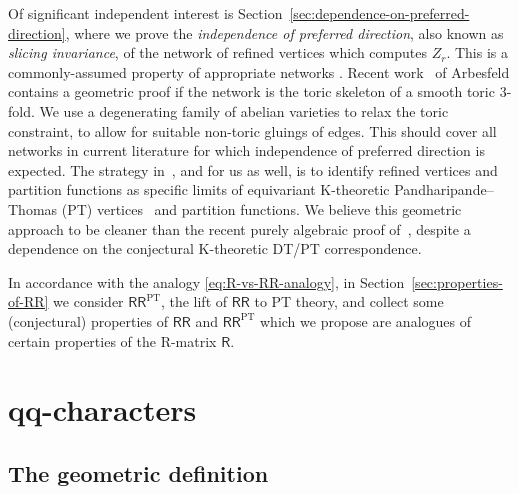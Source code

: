 \documentclass[10pt,a4paper]{amsart}
\numberwithin{equation}{section}
\newcommand{\sR}{\mathsf{R}}
\newcommand{\sRR}{\mathsf{RR}}
\DeclareMathOperator{\PT}{PT}
\begin{document}
Of significant independent interest is
Section~\ref{sec:dependence-on-preferred-direction}, where we prove the {\it
 independence of preferred direction}, also known as {\it slicing
 invariance}, of the network of refined vertices which computes
$Z_r$. This is a commonly-assumed property of appropriate networks
\cite{Awata2013, Iqbal2009, Morozov2016}. Recent work~\cite{Arbesfeld2021} of Arbesfeld contains a geometric proof if the
network is the toric skeleton of a smooth toric $3$-fold. We use a
degenerating family of abelian varieties to relax the toric
constraint, to allow for suitable non-toric gluings of edges. This
should cover all networks in current literature for which independence
of preferred direction is expected. The strategy in~\cite{Arbesfeld2021}, and for us as well, is to identify refined
vertices and partition functions as specific limits of equivariant
K-theoretic Pandharipande--Thomas (PT) vertices~\cite{Pandharipande2009} and partition functions. We believe this
geometric approach to be cleaner than the recent purely algebraic
proof of~\cite{Fukuda2020}, despite a dependence on the conjectural
K-theoretic DT/PT correspondence.

In accordance with
the analogy \eqref{eq:R-vs-RR-analogy}, in
Section~\ref{sec:properties-of-RR} we consider $\sRR^{\PT}$, the lift of
$\sRR$ to PT theory, and collect some (conjectural) properties of
$\sRR$ and $\sRR^{\PT}$ which we propose are analogues of certain
properties of the R-matrix $\sR$.

\section[qq-characters]{$\boldsymbol{qq}$-characters}\label{sec:qq-characters}

\subsection{The geometric definition}
\end{document}
